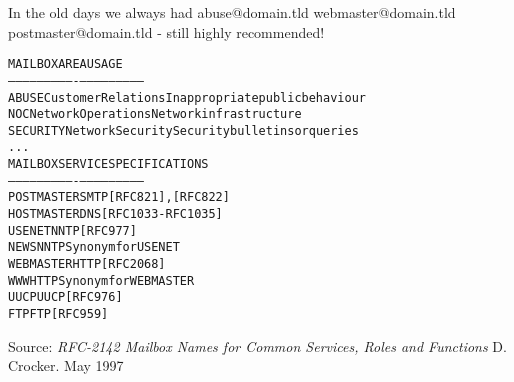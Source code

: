 \documentclass[Screen16to9,17pt]{foils}
\begin{document}
\begin{list2}
\item In the old days we always had abuse@domain.tld webmaster@domain.tld postmaster@domain.tld - still highly recommended!
\end{list2}


\begin{alltt}\small
MAILBOX       AREA                USAGE
-----------   ----------------    ---------------------------
ABUSE         Customer Relations  Inappropriate public behaviour
NOC           Network Operations  Network infrastructure
SECURITY      Network Security    Security bulletins or queries
...
MAILBOX       SERVICE             SPECIFICATIONS
-----------   ----------------    ---------------------------
POSTMASTER    SMTP                [RFC821], [RFC822]
HOSTMASTER    DNS                 [RFC1033-RFC1035]
USENET        NNTP                [RFC977]
NEWS          NNTP                Synonym for USENET
WEBMASTER     HTTP                [RFC 2068]
WWW           HTTP                Synonym for WEBMASTER
UUCP          UUCP                [RFC976]
FTP           FTP                 [RFC959]
\end{alltt}

Source:
\emph{RFC-2142 Mailbox Names for Common Services, Roles and Functions} D.
Crocker. May 1997





\begin{quote}

\end{quote}

\begin{list2}
    \item
\end{list2}




\slidenext{}
\end{document}

